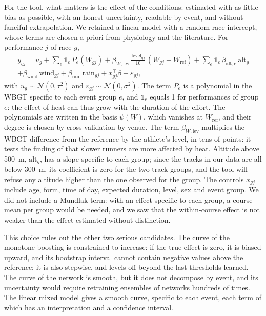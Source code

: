 \documentclass[11pt,a4paper]{article}
\begin{document}
For the tool, what matters is the effect of the conditions: estimated with as little bias as possible, with an honest
uncertainty, readable by event, and without fanciful extrapolation. We retained a linear model with a random race
intercept, whose terms are chosen a priori from physiology and the literature. For performance $j$ of race $g$,
\begin{multline}\label{eq:tool_model}
y_{gj} = u_g + \sum_e \mathbb 1_e\,P_e(W_{gj}) + \beta_{W,\text{lev}}\,\frac{\text{level}_{gj}}{10}\,(W_{gj} - W_{\text{ref}})
+ \sum_e \mathbb 1_e\,\beta_{\text{alt},e}\,\text{alt}_g \\
+ \beta_{\text{wind}}\,\text{wind}_{gj} + \beta_{\text{rain}}\,\text{rain}_{gj} + x_{gj}^\top\beta + \varepsilon_{gj},
\end{multline}
with $u_g \sim \mathcal N(0, \tau^2)$ and $\varepsilon_{gj} \sim \mathcal N(0, \sigma^2)$. The term $P_e$ is a
polynomial in the WBGT specific to each event group $e$, and $\mathbb 1_e$ equals 1 for performances of group $e$: the
effect of heat can thus grow with the duration of the effort. The polynomials are written in the basis $\psi(W)$, which
vanishes at $W_{\text{ref}}$, and their degree is chosen by cross-validation by venue. The term $\beta_{W,\text{lev}}$
multiplies the WBGT difference from the reference by the athlete's level, in tens of points: it tests the finding of
\citet{ely2007} that slower runners are more affected by heat. Altitude above 500~m, $\text{alt}_g$, has a slope
specific to each group; since the tracks in our data are all below 300~m, its coefficient is zero for the two track
groups, and the tool will refuse any altitude higher than the one observed for the group. The controls $x_{gj}$ include
age, form, time of day, expected duration, level, sex and event group. We did not include a Mundlak term: with an effect
specific to each group, a course mean per group would be needed, and we saw that the within-course effect is not weaker
than the effect estimated without distinction.

This choice rules out the other two serious candidates. The curve of the monotone boosting is constrained to increase:
if the true effect is zero, it is biased upward, and its bootstrap interval cannot contain negative values above the
reference; it is also stepwise, and levels off beyond the last thresholds learned. The curve of the network is smooth,
but it does not decompose by event, and its uncertainty would require retraining ensembles of networks hundreds of
times. The linear mixed model gives a smooth curve, specific to each event, each term of which has an interpretation and
a confidence interval.
\end{document}
